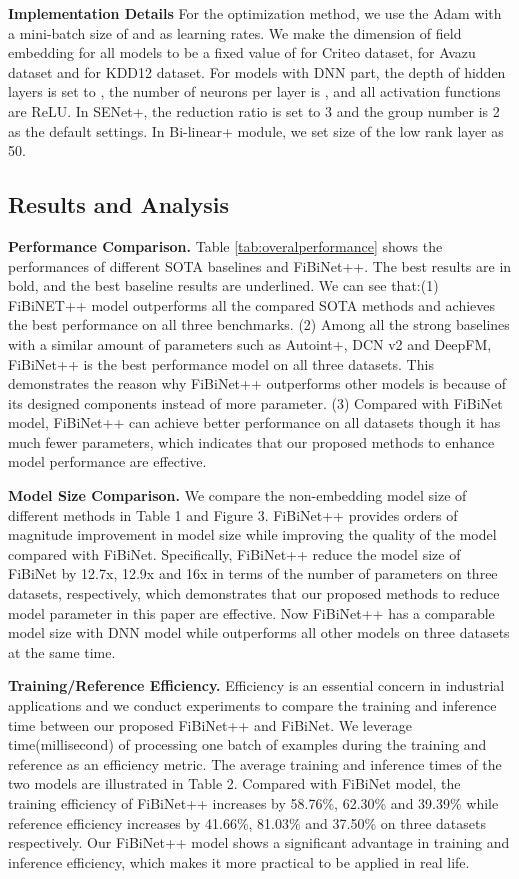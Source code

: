 \documentclass[sigconf]{acmart}
\begin{document}
\textbf{Implementation Details}
For the optimization method, we use the Adam with a mini-batch size of  and  as learning rates. We make the dimension of field embedding for all models to be a fixed value of  for Criteo dataset,   for Avazu dataset and  for KDD12 dataset.  For models with DNN part, the depth of hidden layers is set to , the number of neurons per layer is , and all activation functions are ReLU. In SENet+, the reduction ratio is set to 3 and the group number is 2 as the default settings. In Bi-linear+ module, we set size of the low rank layer as 50. 

\subsection{Results and Analysis}
\textbf{Performance Comparison.}  Table \ref{tab:overalperformance} shows the performances of different SOTA baselines and FiBiNet++.  The best results are in bold, and the best baseline results are underlined. We can see that:(1) FiBiNET++ model outperforms all the compared SOTA methods and achieves the best performance on all three benchmarks. (2) Among all the strong baselines with a similar amount of parameters such as Autoint+, DCN v2 and DeepFM, FiBiNet++ is the best performance model on all three datasets. This demonstrates the reason why FiBiNet++ outperforms other models is because of its designed components instead of more parameter. (3) Compared with FiBiNet model, FiBiNet++ can achieve better performance on all datasets though it has much fewer parameters, which indicates that our proposed methods to enhance model performance are effective.


\textbf{Model Size Comparison.} We compare the non-embedding model size of different methods in Table 1 and Figure 3. FiBiNet++ provides orders of magnitude improvement in model size while improving the quality of the model compared with FiBiNet. Specifically, FiBiNet++ reduce the model size of FiBiNet by 12.7x, 12.9x and 16x in terms of the number of parameters on three datasets, respectively, which demonstrates that our proposed methods to reduce model parameter in this paper are effective. Now FiBiNet++ has a comparable model size with DNN model while outperforms all other models on three datasets at the same time. 

\textbf{Training/Reference Efficiency.} 
Efficiency is an essential concern in industrial applications and we conduct experiments to compare the training and inference time between our proposed FiBiNet++ and FiBiNet. We leverage time(millisecond) of processing one batch of examples during the training and reference as an efficiency metric. The average training and  inference times of the two models are illustrated in Table 2. Compared with FiBiNet model, the training efficiency of FiBiNet++ increases by 58.76\%, 62.30\% and 39.39\% while reference efficiency increases by 41.66\%, 81.03\% and 37.50\% on three datasets respectively. Our FiBiNet++ model shows a significant advantage in training and inference efficiency, which makes it more practical to be applied in real life. 
\end{document}

